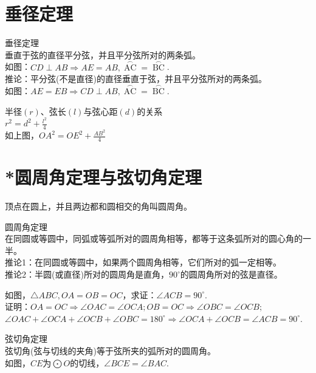 \section{垂径定理}
\begin{theorem}
    垂径定理 \\
    垂直于弦的直径平分弦，并且平分弦所对的两条弧。\\
    如图：$CD\perp AB \Rightarrow AE=AB,\mathop{AC}\limits^{\frown}=\mathop{BC}\limits^{\frown}$. \\
    推论：平分弦(不是直径)的直径垂直于弦，并且平分弦所对的两条弧。\\
    如图：$AE=EB \Rightarrow CD\perp AB,\mathop{AC}\limits^{\frown}=\mathop{BC}\limits^{\frown}$.
\end{theorem}
\begin{theorem}
    半径$(r)$、弦长$(l)$与弦心距$(d)$的关系 \\
    $r^2=d^2+\frac{l^2}{4}$ \\
    如上图，$OA^2=OE^2+\frac{AB^2}{4}$
\end{theorem}
\clearpage
\section{*圆周角定理与弦切角定理}
\begin{theorem}
    顶点在圆上，并且两边都和圆相交的角叫圆周角。
\end{theorem}
\begin{theorem}
    圆周角定理 \\
    在同圆或等圆中，同弧或等弧所对的圆周角相等，都等于这条弧所对的圆心角的一半。\\
    推论1：在同圆或等圆中，如果两个圆周角相等，它们所对的弧一定相等。\\
    推论2：半圆(或直径)所对的圆周角是直角，$90^\circ$的圆周角所对的弦是直径。
\end{theorem}
\begin{theorem}
    如图，$\triangle ABC,OA=OB=OC$，求证：$\angle ACB=90^\circ$. \\
    证明：$OA=OC \Rightarrow \angle OAC=\angle OCA;OB=OC \Rightarrow \angle OBC=\angle OCB;$ \\
    $\angle OAC+\angle OCA+\angle OCB+\angle OBC=180^\circ \Rightarrow \angle OCA+\angle OCB=\angle ACB=90^\circ$.
\end{theorem}
\begin{theorem}
    弦切角定理 \\
    弦切角(弦与切线的夹角)等于弦所夹的弧所对的圆周角。\\
    如图，$CE$为$\bigodot O$的切线，$\angle BCE = \angle BAC$.
\end{theorem}
\clearpage
